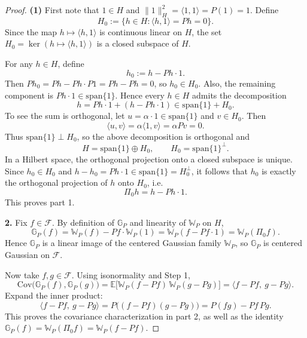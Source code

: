 \documentclass[12pt]{article}
\renewcommand{\(}{\left(}%
\renewcommand{\)}{\right)}%
\renewcommand{\[}{\left[}%
\renewcommand{\]}{\right]}%
\newtheorem{proof}{Proof.}}
\begin{document}
\begin{proof}
\textbf{(1)}
First note that $1\in H$ and $\|1\|_H^2=\langle 1,1\rangle=P(1)=1$. Define
\begin{equation*}
H_0:=\{h\in H:\langle h,1\rangle=Ph=0\}.
\end{equation*}
Since the map $h\mapsto \langle h,1\rangle$ is continuous linear on $H$, the set $H_0=\ker(h\mapsto \langle h,1\rangle)$ is a closed subspace of $H$.

For any $h\in H$, define
\begin{equation*}
h_0:=h-Ph\cdot 1.
\end{equation*}
Then $Ph_0=Ph-Ph\cdot P1=Ph-Ph=0$, so $h_0\in H_0$. Also, the remaining component is $Ph\cdot 1\in \mathrm{span}\{1\}$. Hence every $h\in H$ admits the decomposition
\begin{equation*}
h = Ph\cdot 1 + (h-Ph\cdot 1)
\in \mathrm{span}\{1\}+H_0.
\end{equation*}
To see the sum is orthogonal, let $u=\alpha\cdot 1\in \mathrm{span}\{1\}$ and $v\in H_0$. Then
\begin{equation*}
\langle u,v\rangle = \alpha \langle 1,v\rangle = \alpha Pv = 0.
\end{equation*}
Thus $\mathrm{span}\{1\}\perp H_0$, so the above decomposition is orthogonal and
\begin{equation*}
H=\mathrm{span}\{1\}\oplus H_0,
\qquad
H_0=\mathrm{span}\{1\}^\perp.
\end{equation*}
In a Hilbert space, the orthogonal projection onto a closed subspace is unique. Since $h_0\in H_0$ and $h-h_0=Ph\cdot 1\in \mathrm{span}\{1\}=H_0^\perp$, it follows that $h_0$ is exactly the orthogonal projection of $h$ onto $H_0$, i.e.
\begin{equation*}
\Pi_0 h = h-Ph\cdot 1.
\end{equation*}
This proves part 1.

\medskip
\noindent
\textbf{2.}
Fix $f\in\mathcal F$. By definition of $\mathbb G_P$ and linearity of $\mathbb W_P$ on $H$,
\begin{equation*}
\mathbb G_P(f)=\mathbb W_P(f)-Pf\cdot \mathbb W_P(1)=\mathbb W_P(f-Pf\cdot 1)=\mathbb W_P(\Pi_0 f).
\end{equation*}
Hence $\mathbb G_P$ is a linear image of the centered Gaussian family $\mathbb W_P$, so $\mathbb G_P$ is centered Gaussian on $\mathcal F$.

Now take $f,g\in\mathcal F$. Using isonormality and Step 1,
\begin{equation*}
\mathrm{Cov}\big(\mathbb G_P(f),\mathbb G_P(g)\big)
=\mathbb E\big[\mathbb W_P(f-Pf)\,\mathbb W_P(g-Pg)\big]
=\langle f-Pf,\ g-Pg\rangle.
\end{equation*}
Expand the inner product:
\begin{equation*}
\langle f-Pf,\ g-Pg\rangle
=P\big((f-Pf)(g-Pg)\big)
=P(fg)-Pf\,Pg.
\end{equation*}
This proves the covariance characterization in part 2, as well as the identity $\mathbb G_P(f)=\mathbb W_P(\Pi_0 f)=\mathbb W_P(f-Pf)$.


\end{proof}
\end{document}
